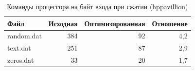 \begin{table}[H]
\caption{Команды процессора на байт входа при сжатии (hppavillion)}
\label{tab:ipb}
\begin{tabletext}
\centering
\begin{tabular}{|l|r|r|r|}
\hline
\textbf{Файл} & \textbf{Исходная} & \textbf{Оптимизированная} & \textbf{Отношение} \\
\hline
random.dat & 384 & 92 & 4,2 \\
text.dat & 251 & 87 & 2,9 \\
zeros.dat & 33 & 20 & 1,7 \\
\hline
\end{tabular}
\end{tabletext}
\end{table}
